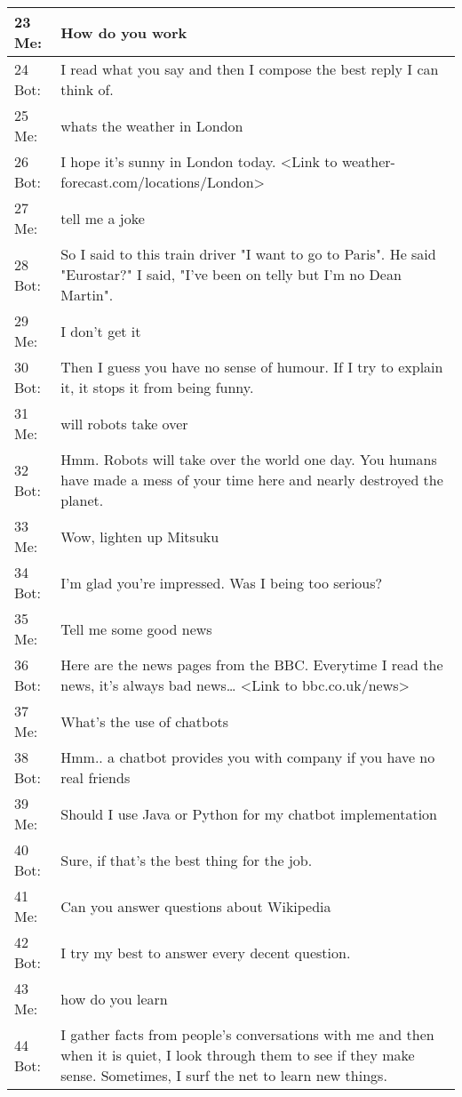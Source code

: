 \begin{longtable}{| p{} | p{} |}
	23 Me: & How do you work \\ \hline
	24 Bot: & I read what you say and then I compose the best reply I can think of. \\ \hline
	25 Me: & whats the weather in London \\ \hline
	26 Bot: & I hope it's sunny in London today. <Link to weather-forecast.com/locations/London> \\ \hline
	27 Me: & tell me a joke \\ \hline
	28 Bot: & So I said to this train driver "I want to go to Paris". He said "Eurostar?" I said, "I've been on telly but I'm no Dean Martin". \\ \hline
	29 Me: & I don't get it \\ \hline
	30 Bot: & Then I guess you have no sense of humour. If I try to explain it, it stops it from being funny. \\ \hline
	31 Me: & will robots take over \\ \hline
	32 Bot: & Hmm. Robots will take over the world one day. You humans have made a mess of your time here and nearly destroyed the planet. \\ \hline
	33 Me: & Wow, lighten up Mitsuku \\ \hline
	34 Bot: & I'm glad you're impressed. Was I being too serious? \\ \hline
	35 Me: & Tell me some good news \\ \hline
	36 Bot: & Here are the news pages from the BBC. Everytime I read the news, it's always bad news… <Link to bbc.co.uk/news> \\ \hline
	37 Me: & What's the use of chatbots \\ \hline
	38 Bot: & Hmm.. a chatbot provides you with company if you have no real friends \\ \hline
	39 Me: & Should I use Java or Python for my chatbot implementation \\ \hline
	40 Bot: & Sure, if that's the best thing for the job. \\ \hline
	41 Me: & Can you answer questions about Wikipedia \\ \hline
	42 Bot: & I try my best to answer every decent question. \\ \hline
	43 Me: & how do you learn \\ \hline
	44 Bot: & I gather facts from people's conversations with me and then when it is quiet, I look through them to see if they make sense. Sometimes, I surf the net to learn new things. \\ \hline

\end{longtable}
